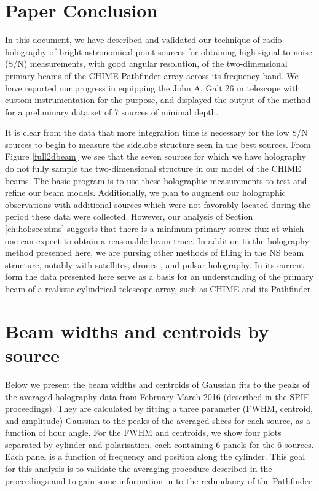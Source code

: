 \section{Paper Conclusion} \label{ch:hol:sec:conclusion}

In this document, we have described and validated our technique of radio holography of bright astronomical point sources for obtaining high signal-to-noise (S/N) measurements, with good angular resolution, of the two-dimensional primary beams of the CHIME Pathfinder array across its frequency band. We have reported our progress in equipping the John A. Galt 26 m telescope with custom instrumentation for the purpose, and displayed the output of the method for a preliminary data set of 7 sources of minimal depth. 

It is clear from the data that more integration time is necessary for the low S/N sources to begin to measure the sidelobe structure seen in the best sources. From Figure \ref{full2dbeam} we see that the seven sources for which we have holography do not fully sample the two-dimensional structure in our model of the CHIME beams. The basic program is to use these holographic measurements to test and refine our beam models. Additionally, we plan to augment our holographic observations with additional sources which were not favorably located during the period these data were collected. However, our analysis of Section \ref{ch:hol:sec:sims} suggests that there is a minimum primary source flux at which one can expect to obtain a reasonable beam trace. In addition to the holography method presented here, we are pursing other methods of filling in the NS beam structure, notably with satellites\citep{hol2, sat2}, drones \citep{drone}, and pulsar holography. In its current form the data presented here serve as a basis for an understanding of the primary beam of a realistic cylindrical telescope array, such as CHIME and its Pathfinder.


\section{Beam widths and centroids by source}

Below we present the beam widths and centroids of Gaussian fits to the peaks of the averaged holography data from February-March 2016 (described in the SPIE proceedings). They are calculated by fitting a three parameter (FWHM, centroid, and amplitude) Gaussian to the peaks of the averaged slices for each source, as a function of hour angle. For the FWHM and centroids, we show four plots separated by cylinder and polarisation, each containing 6 panels for the 6 sources. Each panel is a function of frequency and position along the cylinder. This goal for this analysis is to validate the averaging procedure described in the proceedings and to gain some information in to the redundancy of the Pathfinder.

